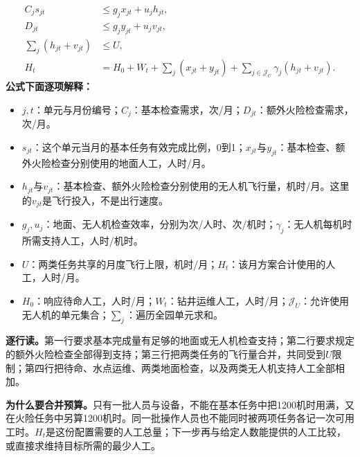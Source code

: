 \documentclass[12pt,a4paper]{article}
\numberwithin{equation}{section}
\begin{document}
\begin{equation}
\begin{aligned}
C_js_{jt}&\le g_jx_{jt}+u_jh_{jt},\\
D_{jt}&\le g_jy_{jt}+u_jv_{jt},\\
\sum_j(h_{jt}+v_{jt})&\le U,\\
H_t&=H_0+W_t+\sum_j(x_{jt}+y_{jt})
+\sum_{j\in\mathcal J_U}\gamma_j(h_{jt}+v_{jt}).
\end{aligned}
\label{eq:monthlycapacity}
\end{equation}
\noindent\textbf{公式下面逐项解释：}
\begin{itemize}
\item $j,t$：单元与月份编号；$C_j$：基本检查需求，次/月；$D_{jt}$：额外火险检查需求，次/月。
\item $s_{jt}$：这个单元当月的基本任务有效完成比例，0到1；$x_{jt}$与$y_{jt}$：基本检查、额外火险检查分别使用的地面人工，人时/月。
\item $h_{jt}$与$v_{jt}$：基本检查、额外火险检查分别使用的无人机飞行量，机时/月。这里的$v_{jt}$是飞行投入，不是出行速度。
\item $g_j,u_j$：地面、无人机检查效率，分别为次/人时、次/机时；$\gamma_j$：无人机每机时所需支持人工，人时/机时。
\item $U$：两类任务共享的月度飞行上限，机时/月；$H_t$：该月方案合计使用的人工，人时/月。
\item $H_0$：响应待命人工，人时/月；$W_t$：钻井运维人工，人时/月；$\mathcal J_U$：允许使用无人机的单元集合；$\sum_j$：遍历全园单元求和。
\end{itemize}
\noindent\textbf{逐行读。}第一行要求基本完成量有足够的地面或无人机检查支持；第二行要求规定的额外火险检查全部得到支持；第三行把两类任务的飞行量合并，共同受到$U$限制；第四行把待命、水点运维、两类地面检查，以及两类无人机支持人工全部相加。

\noindent\textbf{为什么要合并预算。}只有一批人员与设备，不能在基本任务中把1200机时用满，又在火险任务中另算1200机时。同一批操作人员也不能同时被两项任务各记一次可用工时。$H_t$是这份配置需要的人工总量；下一步再与给定人数能提供的人工比较，或直接求维持目标所需的最少人工。
\end{document}
